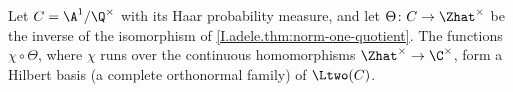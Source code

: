 Let $C=\A^1/\Q^\times$ with its Haar probability measure, and let $\Theta\colon C\to\Zhat^\times$ be the inverse of the
isomorphism of \cref{I.adele.thm:norm-one-quotient}. The functions $\chi\circ\Theta$, where $\chi$ runs over the
continuous homomorphisms $\Zhat^\times\to\C^\times$, form a Hilbert basis (a complete orthonormal family) of $\Ltwo(C)$.
